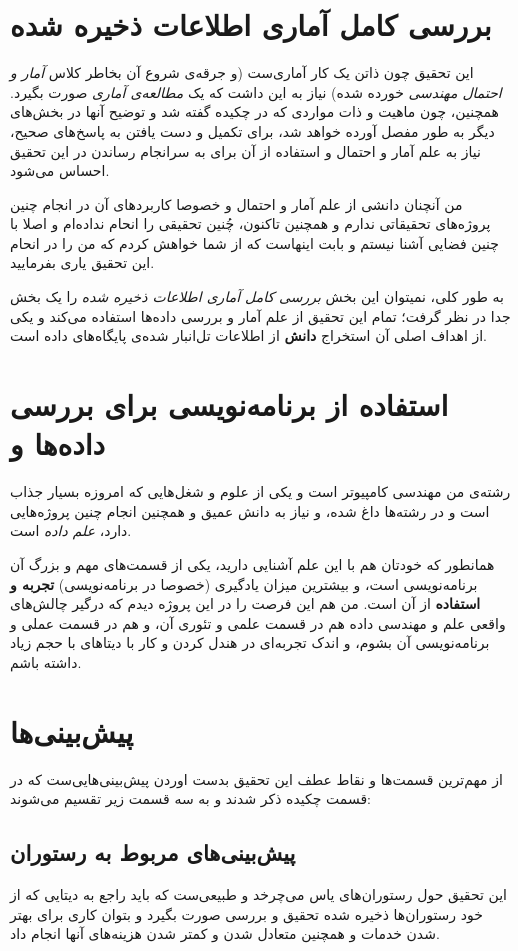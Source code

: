 \documentclass{article}
\begin{document}
	\section{بررسی کامل آماری اطلاعات ذخیره شده}
		این تحقیق چون ذاتن یک کار آماری‌ست (و جرقه‌ی شروع آن بخاطر کلاس \textit{آمار و احتمال مهندسی} خورده شده) نیاز به این داشت که یک \textit{مطالعه‌ی آماری} صورت بگیرد. همچنین، چون ماهیت و ذات مواردی که در چکیده گفته شد و توضیح آنها در بخش‌های دیگر به طور مفصل آورده‌ خواهد شد، برای تکمیل و دست یافتن به پاسخ‌های صحیح، نیاز به علم آمار و احتمال و استفاده از آن برای به سرانجام رساندن در این تحقیق احساس می‌شود.
		
		من آنچنان دانشی از علم آمار و احتمال و خصوصا کاربرد‌های آن در انجام چنین پروژه‌های تحقیقاتی ندارم و همچنین تاکنون، چُنین تحقیقی را انحام نداده‌ام و اصلا با چنین فضایی آشنا نیستم و بابت اینهاست که از شما خواهش کردم که من را در انحام این تحقیق یاری بفرمایید. 
		
		به طور کلی، نمیتوان این بخش \textit{بررسی کامل آماری اطلاعات ذخیره شده} را یک بخش جدا در نظر گرفت؛ تمام این تحقیق از علم آمار و بررسی داده‌ها استفاده می‌کند و یکی از اهداف اصلی‌‌‌ آن استخراج \textbf{دانش} از اطلاعات تل‌انبار شده‌ی پایگاه‌‌های داده است.
		

	\section{استفاده‌ از برنامه‌نویسی برای بررسی داده‌ها و }
		رشته‌ی من مهندسی کامپیوتر است و یکی از علوم و شغل‌‌هایی که امروزه بسیار جذاب است و در رشته‌ها داغ شده، و نیاز به دانش عمیق و همچنین انجام چنین پروژه‌‌هایی دارد، \textit{علم داده‌} است.
		
		همانطور که خودتان هم با این علم آشنایی دارید، یکی از قسمت‌‌های مهم و بزرگ‌ آن برنامه‌نویسی است، و بیشترین میزان یادگیری (خصوصا در برنامه‌نویسی) \textbf{تجربه و استفاده} از آن است. من هم این فرصت را در این پروژه دیدم که درگیر چالش‌های واقعی علم و مهندسی داده هم در قسمت علمی و تئوری آن، و هم در قسمت عملی و برنامه‌نویسی آن بشوم، و اندک تجربه‌ای در هندل کردن و کار با دیتا‌های با حجم زیاد داشته باشم.
		
	\section{پیش‌بینی‌ها}
	    از مهم‌ترین قسمت‌ها و نقاط عطف این تحقیق بدست اوردن پیش‌بینی‌هایی‌ست که در قسمت چکیده ذکر شدند و به سه قسمت زیر تقسیم می‌شوند:
	    \subsection{پیش‌بینی‌های مربوط به رستوران}
	    	این تحقیق حول رستوران‌‌های یاس می‌چرخد و طبیعی‌ست که باید راجع به دیتایی که از خود رستوران‌‌ها ذخیره شده تحقیق و بررسی صورت بگیرد و بتوان کاری برای بهتر شدن خدمات و همچنین متعادل شدن و کمتر شدن هزینه‌های آنها انجام داد.
	    	
\end{document}
